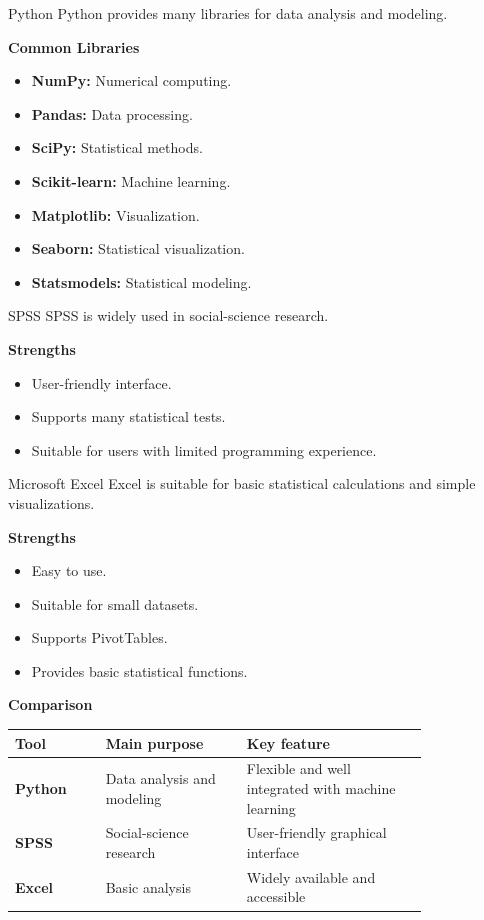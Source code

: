 \documentclass[aspectratio=169,11pt]{beamer}
\begin{document}
\begin{frame}[allowframebreaks]{Python}
\small
Python provides many libraries for data analysis and modeling.\par\medskip
\textbf{Common Libraries}\par\medskip
\begin{itemize}
\item \textbf{NumPy:} Numerical computing.
\item \textbf{Pandas:} Data processing.
\item \textbf{SciPy:} Statistical methods.
\item \textbf{Scikit-learn:} Machine learning.
\item \textbf{Matplotlib:} Visualization.
\item \textbf{Seaborn:} Statistical visualization.
\item \textbf{Statsmodels:} Statistical modeling.
\end{itemize}
\end{frame}
\begin{frame}[allowframebreaks]{SPSS}
\small
SPSS is widely used in social-science research.\par\medskip
\textbf{Strengths}\par\medskip
\begin{itemize}
\item User-friendly interface.
\item Supports many statistical tests.
\item Suitable for users with limited programming experience.
\end{itemize}
\end{frame}
\begin{frame}[allowframebreaks]{Microsoft Excel}
\footnotesize
Excel is suitable for basic statistical calculations and simple visualizations.\par\medskip
\textbf{Strengths}\par\medskip
\begin{itemize}
\item Easy to use.
\item Suitable for small datasets.
\item Supports PivotTables.
\item Provides basic statistical functions.
\end{itemize}
\textbf{Comparison}\par\medskip
\begin{center}\scriptsize
\begin{tabular}{@{}p{0.18\linewidth}p{0.28\linewidth}p{0.36\linewidth}@{}}
\toprule
\textbf{Tool} & \textbf{Main purpose} & \textbf{Key feature}\\
\midrule
\textbf{Python} & Data analysis and modeling & Flexible and well integrated with machine learning\\
\textbf{SPSS} & Social-science research & User-friendly graphical interface\\
\textbf{Excel} & Basic analysis & Widely available and accessible\\
\bottomrule
\end{tabular}
\end{center}
\end{frame}
\end{document}
